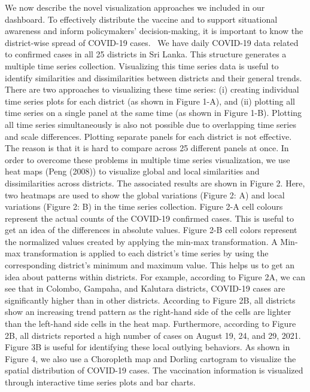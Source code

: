 \documentclass[
]{article}
\begin{document}
We now describe the novel visualization approaches we included in our
dashboard. To effectively distribute the vaccine and to support
situational awareness and inform policymakers' decision-making, it is
important to know the district-wise spread of COVID-19 cases. ~We have
daily COVID-19 data related to confirmed cases in all 25 districts in
Sri Lanka. This structure generates a multiple time series collection.
Visualizing this time series data is useful to identify similarities and
dissimilarities between districts and their general trends. There are
two approaches to visualizing these time series: (i) creating individual
time series plots for each district (as shown in Figure 1-A), and (ii)
plotting all time series on a single panel at the same time (as shown in
Figure 1-B). Plotting all time series simultaneously is also not
possible due to overlapping time series and scale differences. Plotting
separate panels for each district is not effective. The reason is that
it is hard to compare across 25 different panels at once. In order to
overcome these problems in multiple time series visualization, we use
heat maps (Peng (2008)) to visualize global and local similarities and
dissimilarities across districts. The associated results are shown in
Figure 2. Here, two heatmaps are used to show the global variations
(Figure 2: A) and local variations (Figure 2: B) in the time series
collection. Figure 2-A cell colours represent the actual counts of the
COVID-19 confirmed cases. This is useful to get an idea of the
differences in absolute values. Figure 2-B cell colors represent the
normalized values created by applying the min-max transformation. A
Min-max transformation is applied to each district's time series by
using the corresponding district's minimum and maximum value. This helps
us to get an idea about patterns within districts. For example,
according to Figure 2A, we can see that in Colombo, Gampaha, and
Kalutara districts, COVID-19 cases are significantly higher than in
other districts. According to Figure 2B, all districts show an
increasing trend pattern as the right-hand side of the cells are lighter
than the left-hand side cells in the heat map. Furthermore, according to
Figure 2B, all districts reported a high number of cases on August 19,
24, and 29, 2021. Figure 3B is useful for identifying these local
outlying behaviors. As shown in Figure 4, we also use a Choropleth map
and Dorling cartogram to visualize the spatial distribution of COVID-19
cases. The vaccination information is visualized through interactive
time series plots and bar charts.
\end{document}

